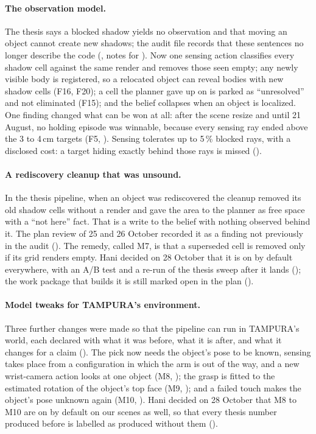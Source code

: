 \paragraph{The observation model.} The thesis says a blocked shadow yields no
observation and that moving an object cannot create new shadows; the audit file
records that these sentences no longer describe the code (, notes for
). Now one sensing action classifies every shadow cell against the same
render and removes those seen empty; any newly visible body is registered, so a
relocated object can reveal bodies with new shadow cells (F16, F20); a cell the
planner gave up on is parked as ``unresolved'' and not eliminated (F15); and the
belief collapses when an object is localized. One finding changed what can be
won at all: after the scene resize and until 21 August, no holding episode was
winnable, because every sensing ray ended above the 3 to 4\,cm targets (F5,
). Sensing tolerates up to 5\,\% blocked rays, with a
disclosed cost: a target hiding exactly behind those rays is missed ().

\paragraph{A rediscovery cleanup that was unsound.} In the thesis pipeline,
when an object was rediscovered the cleanup removed its old shadow cells
without a render and gave the area to the planner as free space with a
``not here'' fact. That is a write to the belief with nothing observed
behind it. The plan review of 25 and 26 October recorded it as a finding not
previously in the audit (). The remedy, called M7, is that a superseded
cell is removed only if its grid renders empty. Hani decided on 28 October that it
is on by default everywhere, with an A/B test and a re-run of the thesis sweep
after it lands (); the work package that builds it is still marked open in
the plan ().

\paragraph{Model tweaks for TAMPURA's environment.} Three further changes were
made so that the pipeline can run in TAMPURA's world, each declared with what it
was before, what it is after, and what it changes for a claim (). The pick
now needs the object's pose to be known, sensing takes place from a configuration
in which the arm is out of the way, and a new wrist-camera action looks at one
object (M8, ); the grasp is fitted to the estimated rotation of the object's
top face (M9, ); and a failed touch makes the object's pose unknown again
(M10, ). Hani decided on 28 October that M8 to M10 are on by default on our
scenes as well, so that every thesis number produced before is labelled as
produced without them ().

